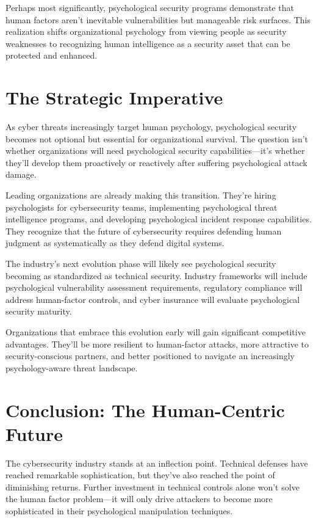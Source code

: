 \documentclass[10pt, twocolumn]{article}
\begin{document}
Perhaps most significantly, psychological security programs demonstrate that human factors aren't inevitable vulnerabilities but manageable risk surfaces. This realization shifts organizational psychology from viewing people as security weaknesses to recognizing human intelligence as a security asset that can be protected and enhanced.

\section{The Strategic Imperative}

As cyber threats increasingly target human psychology, psychological security becomes not optional but essential for organizational survival. The question isn't whether organizations will need psychological security capabilities—it's whether they'll develop them proactively or reactively after suffering psychological attack damage.

Leading organizations are already making this transition. They're hiring psychologists for cybersecurity teams, implementing psychological threat intelligence programs, and developing psychological incident response capabilities. They recognize that the future of cybersecurity requires defending human judgment as systematically as they defend digital systems.

The industry's next evolution phase will likely see psychological security becoming as standardized as technical security. Industry frameworks will include psychological vulnerability assessment requirements, regulatory compliance will address human-factor controls, and cyber insurance will evaluate psychological security maturity.

Organizations that embrace this evolution early will gain significant competitive advantages. They'll be more resilient to human-factor attacks, more attractive to security-conscious partners, and better positioned to navigate an increasingly psychology-aware threat landscape.

\section{Conclusion: The Human-Centric Future}

The cybersecurity industry stands at an inflection point. Technical defenses have reached remarkable sophistication, but they've also reached the point of diminishing returns. Further investment in technical controls alone won't solve the human factor problem—it will only drive attackers to become more sophisticated in their psychological manipulation techniques.
\end{document}
